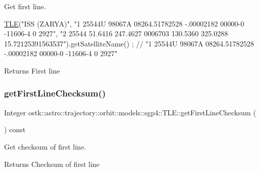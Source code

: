 Get first line. 


\begin{DoxyCode}
\hyperlink{classostk_1_1astro_1_1trajectory_1_1orbit_1_1models_1_1sgp4_1_1_t_l_e_a57323db2c24577c2e8ddce79fa776d1e}{TLE}(\textcolor{stringliteral}{"ISS (ZARYA)"},
    \textcolor{stringliteral}{"1 25544U 98067A   08264.51782528 -.00002182  00000-0 -11606-4 0  2927"},
    \textcolor{stringliteral}{"2 25544  51.6416 247.4627 0006703 130.5360 325.0288 15.72125391563537"}).getSatelliteName() ; \textcolor{comment}{// "1
       25544U 98067A   08264.51782528 -.00002182  00000-0 -11606-4 0  2927"}
\end{DoxyCode}


\begin{DoxyReturn}{Returns}
First line 
\end{DoxyReturn}
\mbox{\label{classostk_1_1astro_1_1trajectory_1_1orbit_1_1models_1_1sgp4_1_1_t_l_e_a9794bb184799595fefc8828c2849538c}} 
\subsubsection{\texorpdfstring{get\+First\+Line\+Checksum()}{getFirstLineChecksum()}}
{\footnotesize\ttfamily Integer ostk\+::astro\+::trajectory\+::orbit\+::models\+::sgp4\+::\+T\+L\+E\+::get\+First\+Line\+Checksum (\begin{DoxyParamCaption}{ }\end{DoxyParamCaption}) const}



Get checksum of first line. 

\begin{DoxyReturn}{Returns}
Checksum of first line 
\end{DoxyReturn}
\mbox{\label{classostk_1_1astro_1_1trajectory_1_1orbit_1_1models_1_1sgp4_1_1_t_l_e_a5e748208f49fc10cc1b925cffa095f67}} 
